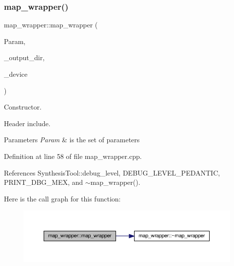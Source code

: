 \subsubsection{\texorpdfstring{map\+\_\+wrapper()}{map\_wrapper()}}
{\footnotesize\ttfamily map\+\_\+wrapper\+::map\+\_\+wrapper (\begin{DoxyParamCaption}\item[{const \hyperlink{Parameter_8hpp_a37841774a6fcb479b597fdf8955eb4ea}{Parameter\+Const\+Ref} \&}]{Param,  }\item[{const std\+::string \&}]{\+\_\+output\+\_\+dir,  }\item[{const \hyperlink{target__device_8hpp_acedb2b7a617e27e6354a8049fee44eda}{target\+\_\+device\+Ref} \&}]{\+\_\+device }\end{DoxyParamCaption})}



Constructor. 

Header include.


\begin{DoxyParams}{Parameters}
{\em Param} & is the set of parameters \\
\hline
\end{DoxyParams}


Definition at line 58 of file map\+\_\+wrapper.\+cpp.



References Synthesis\+Tool\+::debug\+\_\+level, D\+E\+B\+U\+G\+\_\+\+L\+E\+V\+E\+L\+\_\+\+P\+E\+D\+A\+N\+T\+IC, P\+R\+I\+N\+T\+\_\+\+D\+B\+G\+\_\+\+M\+EX, and $\sim$map\+\_\+wrapper().

Here is the call graph for this function\+:
\nopagebreak
\begin{figure}[H]
\begin{center}
\leavevmode
\includegraphics[width=350pt]{d4/d76/classmap__wrapper_a6668af09ee3313be9012e8ea4f628141_cgraph}
\end{center}
\end{figure}
\mbox{\label{classmap__wrapper_a5d4f96f4531ad0dfc8634d1a23581557}} 

